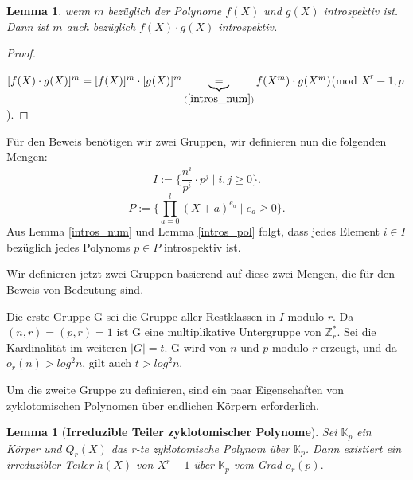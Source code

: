 \documentclass[12pt,oneside]{article}
\newtheorem{lemma}[theorem]{Lemma}
\theoremstyle{remark}
\theoremstyle{definition}
\begin{document}
\smallskip

\begin{lemma}
wenn $m$ bezüglich der Polynome $f(X)$ und $g(X)$ introspektiv ist. Dann ist $m$ auch bezüglich $f(X) \cdot g(X)$ introspektiv.  
\end{lemma}


\begin{proof}\label{intros_pol}
    \centerline{$[f(X) \cdot g(X)]^{m} = [f(X)]^m \cdot [g(X)]^m \underbrace{=}_{(\ref{intros_num})} f(X^m) \cdot g(X^m)$(mod $X^r - 1, p$).}
\end{proof}

Für den Beweis benötigen wir zwei Gruppen, wir definieren nun die folgenden Mengen:\newline\newline
\begin{equation}\label{I_Set}
      I := \{ \frac{n^i}{p^i} \cdot p^j \mid i,j \geq 0\}.
\end{equation}
\begin{equation}
     P := \{ \prod_{a = 0}^{l} (X + a)^{e_{a}} \mid e_{a} \geq 0 \}.
\end{equation}\label{P_Set}
\newline\newline
Aus Lemma \ref{intros_num} und Lemma \ref{intros_pol} folgt, dass jedes Element $i \in I$ bezüglich jedes Polynoms $p \in P$ introspektiv ist.\newline\newline

Wir definieren jetzt zwei Gruppen basierend auf diese zwei Mengen, die für den Beweis von Bedeutung sind.\newline\newline

Die erste Gruppe G sei die Gruppe aller Restklassen in $I$ modulo $r$. Da $(n,r) = (p,r) = 1 $ ist G eine multiplikative Untergruppe von $\mathbb{Z}_{r}^{*}$. Sei die Kardinalität im weiteren $ | G | = t $. G wird von $n$ und $p$ modulo $r$ erzeugt, und da $o_{r}(n) > log^2 n$, gilt auch $t > log^2 n$.\newline\newline

Um die zweite Gruppe zu definieren, sind ein paar Eigenschaften von zyklotomischen Polynomen über endlichen Körpern erforderlich.

\begin{lemma}[\textbf{Irreduzible Teiler zyklotomischer Polynome}] Sei $\mathbb{K}_{p}$ ein Körper und $Q_{r}(X)$ das r-te zyklotomische Polynom über $\mathbb{K}_{p}$. Dann existiert ein irreduzibler Teiler $h(X)$ von $X^r - 1$ über $\mathbb{K}_{p}$ vom Grad $o_{r}(p).$
\end{lemma}
\end{document}
